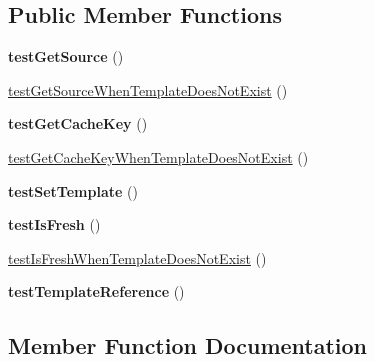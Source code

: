 \subsection*{Public Member Functions}
\begin{DoxyCompactItemize}
\item 
{\bfseries test\+Get\+Source} ()\hypertarget{classTwig__Tests__Loader__ArrayTest_a1ad1bb0775cad26772aeb524fa5ce309}{}\label{classTwig__Tests__Loader__ArrayTest_a1ad1bb0775cad26772aeb524fa5ce309}

\item 
\hyperlink{classTwig__Tests__Loader__ArrayTest_a4699b4158f17bc34be4d7994e5e36899}{test\+Get\+Source\+When\+Template\+Does\+Not\+Exist} ()
\item 
{\bfseries test\+Get\+Cache\+Key} ()\hypertarget{classTwig__Tests__Loader__ArrayTest_a004301a60569b8c5694ab8a4dd1d17ed}{}\label{classTwig__Tests__Loader__ArrayTest_a004301a60569b8c5694ab8a4dd1d17ed}

\item 
\hyperlink{classTwig__Tests__Loader__ArrayTest_a3e133bb125e9b9713d59914be14f712e}{test\+Get\+Cache\+Key\+When\+Template\+Does\+Not\+Exist} ()
\item 
{\bfseries test\+Set\+Template} ()\hypertarget{classTwig__Tests__Loader__ArrayTest_aea6f7ed7cd9b7dc3aeb07701fe3617e2}{}\label{classTwig__Tests__Loader__ArrayTest_aea6f7ed7cd9b7dc3aeb07701fe3617e2}

\item 
{\bfseries test\+Is\+Fresh} ()\hypertarget{classTwig__Tests__Loader__ArrayTest_af356486edf31dd299ec415807f8299b5}{}\label{classTwig__Tests__Loader__ArrayTest_af356486edf31dd299ec415807f8299b5}

\item 
\hyperlink{classTwig__Tests__Loader__ArrayTest_a319474a820322d1193cd1aaff94e80b4}{test\+Is\+Fresh\+When\+Template\+Does\+Not\+Exist} ()
\item 
{\bfseries test\+Template\+Reference} ()\hypertarget{classTwig__Tests__Loader__ArrayTest_ae5acd8915705b7928de26e8f5f0cd0b7}{}\label{classTwig__Tests__Loader__ArrayTest_ae5acd8915705b7928de26e8f5f0cd0b7}

\end{DoxyCompactItemize}


\subsection{Member Function Documentation}
